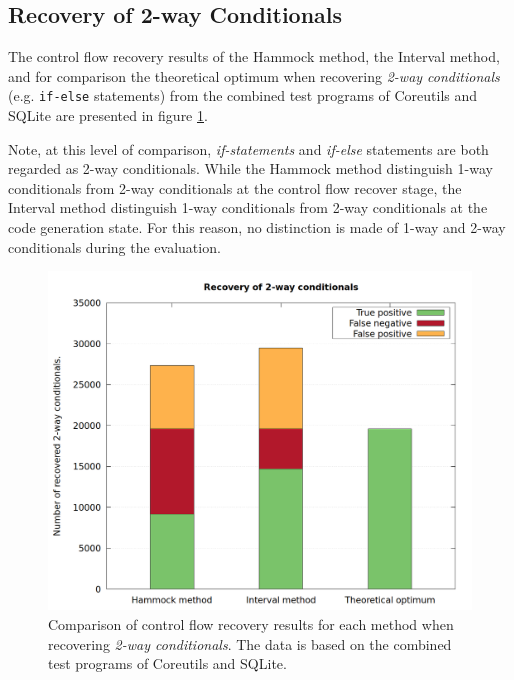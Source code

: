 \clearpage

\subsection{Recovery of 2-way Conditionals}

The control flow recovery results of the Hammock method, the Interval method, and for comparison the theoretical optimum when recovering \textit{2-way conditionals} (e.g. \texttt{if-else} statements) from the combined test programs of Coreutils and SQLite are presented in figure \ref{fig:total_results_2way}.

Note, at this level of comparison, \textit{if-statements} and \textit{if-else} statements are both regarded as 2-way conditionals. While the Hammock method distinguish 1-way conditionals from 2-way conditionals at the control flow recover stage, the Interval method distinguish 1-way conditionals from 2-way conditionals at the code generation state. For this reason, no distinction is made of 1-way and 2-way conditionals during the evaluation.

\begin{figure}[htbp]
	\centering
	\includegraphics[width=\textwidth]{inc/5_results/results_2-way.png}
	\caption{Comparison of control flow recovery results for each method when recovering \textit{2-way conditionals}. The data is based on the combined test programs of Coreutils and SQLite.}
	\label{fig:total_results_2way}
\end{figure}

\clearpage

